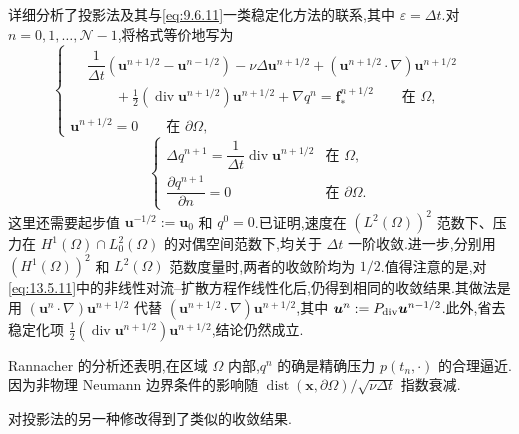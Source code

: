 详细分析了投影法及其与\eqref{eq:9.6.11}一类稳定化方法的联系,其中 \(\varepsilon=\Delta t\).对 \(n=0,1,\ldots,\mathcal N-1\),将格式等价地写为
\begin{equation}\label{eq:13.5.11}
  \begin{cases}
    \begin{aligned}
      &\dfrac1{\Delta t}(\boldsymbol{u}^{n+1/2}-\boldsymbol{u}^{n-1/2})
        -\nu\Delta\boldsymbol{u}^{n+1/2}
        +(\boldsymbol{u}^{n+1/2}\cdot\nabla)\boldsymbol{u}^{n+1/2}\\
      &\qquad+\tfrac12(\operatorname{div}\boldsymbol{u}^{n+1/2})\boldsymbol{u}^{n+1/2}
        +\nabla q^n=\boldsymbol{f}_*^{n+1/2}\qquad\text{在 }\Omega,
    \end{aligned}\\[2pt]
    \boldsymbol{u}^{n+1/2}=0\qquad\text{在 }\partial\Omega,
  \end{cases}
\end{equation}
\begin{equation}\label{eq:13.5.12}
  \begin{cases}
    \Delta q^{n+1}=\dfrac1{\Delta t}\operatorname{div}\boldsymbol{u}^{n+1/2}
      & \text{在 }\Omega,\\[2pt]
    \dfrac{\partial q^{n+1}}{\partial n}=0 & \text{在 }\partial\Omega.
  \end{cases}
\end{equation}
这里还需要起步值 \(\boldsymbol{u}^{-1/2}:=\boldsymbol{u}_0\) 和 \(q^0=0\).已证明,速度在 \((L^2(\Omega))^2\) 范数下、压力在 \(H^1(\Omega)\cap L_0^2(\Omega)\) 的对偶空间范数下,均关于 \(\Delta t\) 一阶收敛.进一步,分别用 \((H^1(\Omega))^2\) 和 \(L^2(\Omega)\) 范数度量时,两者的收敛阶均为 \(1/2\).值得注意的是,对\eqref{eq:13.5.11}中的非线性对流--扩散方程作线性化后,仍得到相同的收敛结果.其做法是用 \((\boldsymbol{u}^n\cdot\nabla)\boldsymbol{u}^{n+1/2}\) 代替 \((\boldsymbol{u}^{n+1/2}\cdot\nabla)\boldsymbol{u}^{n+1/2}\),其中 \(\boldsymbol{u}^n:=P_{\rm div}\boldsymbol{u}^{n-1/2}\).此外,省去稳定化项 \(\tfrac12(\operatorname{div}\boldsymbol{u}^{n+1/2})\boldsymbol{u}^{n+1/2}\),结论仍然成立.

Rannacher 的分析还表明,在区域 \(\Omega\) 内部,\(q^n\) 的确是精确压力 \(p(t_n,\cdot)\) 的合理逼近.因为非物理 Neumann 边界条件的影响随 \(\operatorname{dist}(\boldsymbol{x},\partial\Omega)/\sqrt{\nu\Delta t}\) 指数衰减.

对投影法的另一种修改得到了类似的收敛结果.

